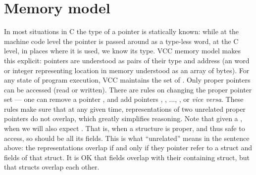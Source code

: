 \section{Memory model}
\label{sect:memmodel}

In most situations in C the type of a pointer is statically known:
while at the machine code level the pointer is passed around as a type-less
word, at the C level, in places where it is used, we know its type.
VCC memory model makes this explicit: pointers are understood as pairs
of their type and address (an word or integer representing location in memory
understood as an array of bytes).
For any state of program execution, VCC maintains the set of .
Only proper pointers can be accessed (read or written).
There are rules on changing the proper pointer set --- \eg one can remove
a pointer , and add pointers , ,
..., , or \emph{vice versa}.
These rules make sure that at any given time, representations of two
unrelated proper pointers do not overlap, which greatly simplifies reasoning.
Note that given a , when 
we will also expect .
That is, when a structure is proper, and thus safe to access, so should
be all its fields.
This is what ``unrelated'' means in the sentence above:
the representations overlap if and only if they pointer refer to a struct
and fields of that struct.
It is OK that fields overlap with their containing struct, but that
structs overlap each other.

